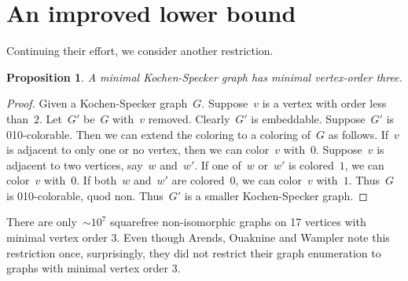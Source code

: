 \documentclass[a4paper]{article}
\newcounter{main}
\newtheorem{prop}[main]{Proposition}
\theoremstyle{definition}
\theoremstyle{remark}
\begin{document}
\section{An improved lower bound}
\label{sec:ilb}
Continuing their effort, we consider another restriction.
\begin{prop}
    A minimal Kochen-Specker graph has minimal vertex-order three.
\end{prop}
\begin{proof}
    Given a Kochen-Specker graph~$G$.
    Suppose~$v$ is a vertex with order less than~$2$.
    Let~$G'$ be~$G$ with~$v$ removed.
    Clearly~$G'$ is embeddable.
    Suppose~$G'$ is 010-colorable.
    Then we can extend the coloring to a coloring of~$G$ as follows.
    If~$v$ is adjacent to only one or no vertex,
    then we can color~$v$ with~$0$.
    Suppose~$v$ is adjacent to two vertices, say~$w$ and~$w'$.
    If one of~$w$ or~$w'$ is colored~$1$, we can color~$v$ with~$0$.
    If both~$w$ and~$w'$ are colored~$0$, we can color~$v$ with~$1$.
    Thus~$G$ is 010-colorable, quod non.  Thus~$G'$ is a smaller
    Kochen-Specker graph.
\end{proof}
There are only~${\sim}10^7$
squarefree non-isomorphic graphs on 17 vertices with minimal vertex order 3.
Even though Arends, Ouaknine and Wampler
note this restriction once,
surprisingly, they did not restrict their graph enumeration
to graphs with minimal vertex order 3.
\end{document}
